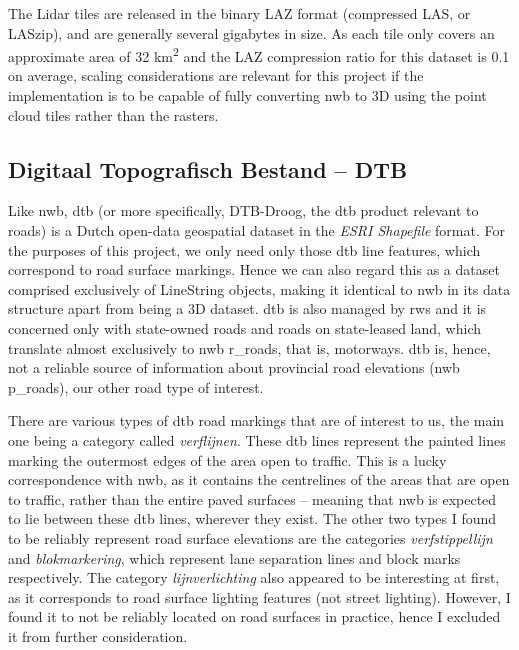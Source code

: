 The Lidar tiles are released in the binary LAZ format (compressed LAS, or LASzip), and are generally several gigabytes in size. As each tile only covers an approximate area of 32 km\textsuperscript{2} and the LAZ compression ratio for this dataset is 0.1 on average, scaling considerations are relevant for this project if the implementation is to be capable of fully converting \ac{nwb} to 3D using the point cloud tiles rather than the rasters.

\subsection{Digitaal Topografisch Bestand – DTB}
\label{sub:dtb}

Like \ac{nwb}, \ac{dtb} (or more specifically, DTB-Droog, the \ac{dtb} product relevant to roads) is a Dutch open-data geospatial dataset in the \textit{ESRI Shapefile} format. For the purposes of this project, we only need only those \ac{dtb} line features, which correspond to road surface markings. Hence we can also regard this as a dataset comprised exclusively of LineString objects, making it identical to \ac{nwb} in its data structure apart from being a 3D dataset. \ac{dtb} is also managed by \ac{rws} and it is concerned only with state-owned roads and roads on state-leased land, which translate almost exclusively to \ac{nwb} \ac{r_roads}, that is, motorways. \ac{dtb} is, hence, not a reliable source of information about provincial road elevations (\ac{nwb} \ac{p_roads}), our other road type of interest.

There are various types of \ac{dtb} road markings that are of interest to us, the main one being a category called \textit{verflijnen}. These \ac{dtb} lines represent the painted lines marking the outermost edges of the area open to traffic. This is a lucky correspondence with \ac{nwb}, as it contains the centrelines of the areas that are open to traffic, rather than the entire paved surfaces – meaning that \ac{nwb} is expected to lie between these \ac{dtb} lines, wherever they exist. The other two types I found to be reliably represent road surface elevations are the categories \textit{verfstippellijn} and \textit{blokmarkering}, which represent lane separation lines and block marks respectively. The category \textit{lijnverlichting} also appeared to be interesting at first, as it corresponds to road surface lighting features (not street lighting). However, I found it to not be reliably located on road surfaces in practice, hence I excluded it from further consideration.

